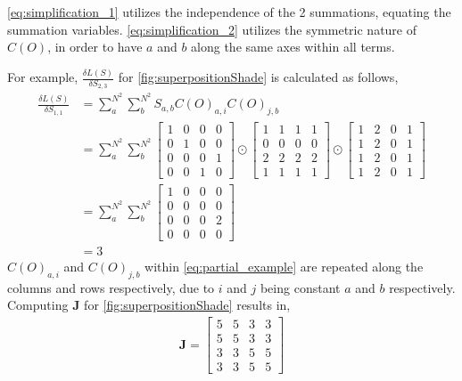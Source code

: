 \autoref{eq:simplification_1} utilizes the independence of the 2 summations, equating the summation variables. \autoref{eq:simplification_2} utilizes the symmetric nature of $C(O)$, in order to have $a$ and $b$ along the same axes within all terms.

For example, $\frac{\delta L(S)}{\delta S_{2,3}}$ for \autoref{fig:superpositionShade} is calculated as follows,
\begin{align}
    \frac{\delta L(S)}{\delta S_{1,1}}&=\sum_{a}^{N^2} \sum_{b}^{N^2} S_{a,b} C(O)_{a,i}C(O)_{j,b}\nonumber\\
      &=\sum_{a}^{N^2} \sum_{b}^{N^2}
      \begin{bmatrix}
          1&0&0&0\\
          0&1&0&0\\
          0&0&0&1\\
          0&0&1&0
      \end{bmatrix}\odot
      \begin{bmatrix}
          1&1&1&1\\
          0&0&0&0\\
          2&2&2&2\\
          1&1&1&1
      \end{bmatrix}\odot
      \begin{bmatrix}
          1&2&0&1\\
          1&2&0&1\\
          1&2&0&1\\
          1&2&0&1
      \end{bmatrix}\label{eq:partial_example}\\
      &=\sum_{a}^{N^2} \sum_{b}^{N^2}
      \begin{bmatrix}
          1&0&0&0\\
          0&0&0&0\\
          0&0&0&2\\
          0&0&0&0
      \end{bmatrix}\nonumber\\
      &=3
\end{align}
$C(O)_{a,i}$ and $C(O)_{j,b}$ within \autoref{eq:partial_example} are repeated along the columns and rows respectively, due to $i$ and $j$ being constant \wrt{} $a$ and $b$ respectively. Computing $\bm{J}$ for \autoref{fig:superpositionShade} results in,
\begin{align}
    \bm{J}=\begin{bmatrix}
          5&5&3&3\\
          5&5&3&3\\
          3&3&5&5\\
          3&3&5&5
      \end{bmatrix}
    \label{eq:jacobian_example}
\end{align}

